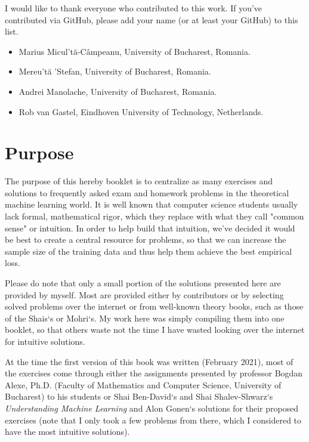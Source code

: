 \documentclass{article}
\newcommand{\<}{\langle}
\renewcommand{\>}{\rangle}
\theoremstyle{definition}
\begin{document}
I would like to thank everyone who contributed to this work. If you've contributed via GitHub, please add your name (or at least your GitHub) to this list.

\begin{itemize}
    \item[] Marius Micul't\u{a}-C\^{a}mpeanu, University of Bucharest, Romania.
    \item[] Mereu't\u{a} 'Stefan, University of Bucharest, Romania.
    \item[] Andrei Manolache, University of Bucharest, Romania.
    \item[] Rob van Gastel,  Eindhoven University of Technology, Netherlands.
\end{itemize}

\newpage

\section*{Purpose}

The purpose of this hereby booklet is to centralize as many exercises and solutions to frequently asked exam and homework problems in the theoretical machine learning world. 
It is well known that computer science students usually lack formal, mathematical rigor, which they replace with what they call "common sense" or intuition. In order to help build that intuition, we've decided it would be best to create a central resource for problems, so that we can increase the sample size of the training data and thus help them achieve the best empirical loss.

Please do note that only a small portion of the solutions presented here are provided by myself. Most are provided either by contributors or by selecting solved problems over the internet or from well-known theory books, such as those of the Shais`s or Mohri`s. My work here was simply compiling them into one booklet, so that others waste not the time I have wasted looking over the internet for intuitive solutions.

At the time the first version of this book was written (February 2021), most of the exercises come through either the assignments presented by professor Bogdan Alexe, Ph.D. (Faculty of Mathematics and Computer Science, University of Bucharest) to his students or Shai Ben-David`s and Shai Shalev-Shwarz`s \textit{Understanding Machine Learning} and Alon Gonen`s solutions for their proposed exercises (note that I only took a few problems from there, which I considered to have the most intuitive solutions).
\end{document}

